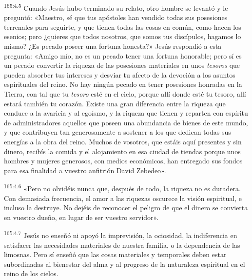 \par 
\textsuperscript{165:4.5} Cuando Jesús hubo terminado su relato, otro hombre se levantó y le preguntó: «Maestro, sé que tus apóstoles han vendido todas sus posesiones terrenales para seguirte, y que tienen todas las cosas en común, como hacen los esenios; pero ¿quieres que todos nosotros, que somos tus discípulos, hagamos lo mismo? ¿Es pecado poseer una fortuna honesta?» Jesús respondió a esta pregunta: «Amigo mío, no es un pecado tener una fortuna honorable; pero sí es un pecado convertir la riqueza de las posesiones materiales en unos \textit{tesoros} que pueden absorber tus intereses y desviar tu afecto de la devoción a los asuntos espirituales del reino. No hay ningún pecado en tener posesiones honradas en la Tierra, con tal que tu \textit{tesoro} esté en el cielo, porque allí donde esté tu tesoro, allí estará también tu corazón. Existe una gran diferencia entre la riqueza que conduce a la avaricia y al egoísmo, y la riqueza que tienen y reparten con espíritu de administradores aquellos que poseen una abundancia de bienes de este mundo, y que contribuyen tan generosamente a sostener a los que dedican todas sus energías a la obra del reino. Muchos de vosotros, que estáis aquí presentes y sin dinero, recibís la comida y el alojamiento en esa ciudad de tiendas porque unos hombres y mujeres generosos, con medios económicos, han entregado sus fondos para esa finalidad a vuestro anfitrión David Zebedeo».

\par 
\textsuperscript{165:4.6} «Pero no olvidéis nunca que, después de todo, la riqueza no es duradera. Con demasiada frecuencia, el amor a las riquezas oscurece la visión espiritual, e incluso la destruye. No dejéis de reconocer el peligro de que el dinero se convierta en vuestro dueño, en lugar de ser vuestro servidor».

\par 
\textsuperscript{165:4.7} Jesús no enseñó ni apoyó la imprevisión, la ociosidad, la indiferencia en satisfacer las necesidades materiales de nuestra familia, o la dependencia de las limosnas. Pero sí enseñó que las cosas materiales y temporales deben estar subordinadas al bienestar del alma y al progreso de la naturaleza espiritual en el reino de los cielos.

